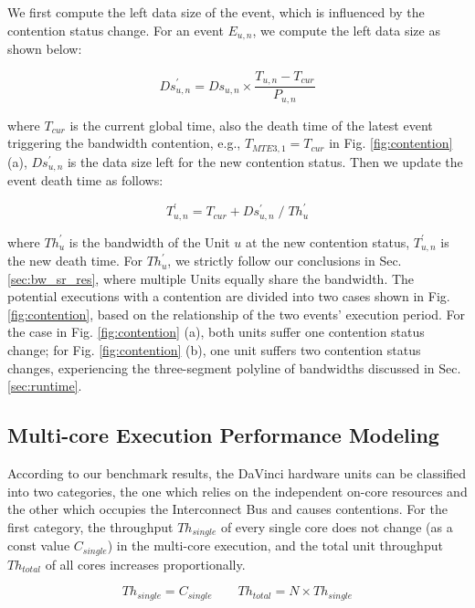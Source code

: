 We first compute the left data size of the event, which is influenced by the contention status change. For an event $E_{u, n}$, we compute the left data size as shown below:

\begin{equation}
Ds^{\prime}_{u, n} = Ds_{u, n} \times \frac{T_{u, n} - T_{cur}}{P_{u, n}}
\end{equation}

where $T_{cur}$ is the current global time, also the death time of the latest event triggering the bandwidth contention, e.g., $T_{MTE3, 1} = T_{cur}$ in Fig. \ref{fig:contention} (a), $Ds^{\prime}_{u, n}$ is the data size left for the new contention status. Then we update the event death time as follows:

\begin{equation}
T^{\prime}_{u, n} = T_{cur} + Ds^{\prime}_{u,n}\;/\;Th^{\prime}_{u}
\end{equation}

where $Th^{\prime}_{u}$ is the bandwidth of the Unit $u$ at the new contention status, $T^{\prime}_{u, n}$ is the new death time. For $Th^{\prime}_{u}$, we strictly follow our conclusions in Sec. \ref{sec:bw_sr_res}, where multiple Units equally share the bandwidth. The potential executions with a contention are divided into two cases shown in Fig. \ref{fig:contention}, based on the relationship of the two events' execution period. For the case in Fig. \ref{fig:contention} (a), both units suffer one contention status change; for Fig. \ref{fig:contention} (b), one unit suffers two contention status changes, experiencing the three-segment polyline of bandwidths discussed in Sec. \ref{sec:runtime}. 

\subsection{Multi-core Execution Performance Modeling \label{sec:multi-core}}

According to our benchmark results, the DaVinci hardware units can be classified into two categories, the one which relies on the independent on-core resources and the other which occupies the Interconnect Bus and causes contentions. For the first category, the throughput $Th_{single}$ of every single core does not change (as a const value $C_{single}$) in the multi-core execution, and the total unit throughput $Th_{total}$ of all cores increases proportionally.

\begin{equation}
\label{eq:first}
Th_{single} = C_{single} \qquad Th_{total} = N \times Th_{single}
\end{equation}


